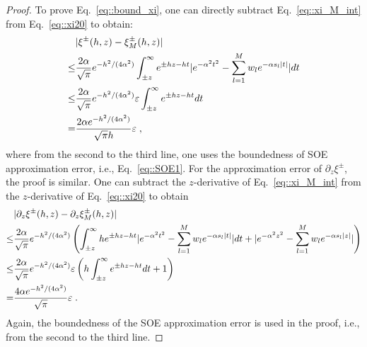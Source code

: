 \begin{proof}
	To prove Eq.~\eqref{eq::bound_xi}, one can directly subtract Eq.~\eqref{eq::xi_M_int} from  Eq.~\eqref{eq::xi20} to obtain:
	\begin{equation}
		\begin{split}
			&\lvert\xi^{\pm}(h, z) - \xi_{M}^{\pm}(h, z)\rvert\\
			\leq & \frac{2 \alpha}{\sqrt{\pi}} e^{-h^2/(4 \alpha^2)} \int_{\pm z}^\infty e^{\pm hz - h t} \lvert e^{-\alpha^2 t^2} - \sum_{l = 1}^M w_l e^{-\alpha s_l\lvert t\rvert} \rvert dt \\
			\leq & \frac{2 \alpha}{\sqrt{\pi}} e^{ - h^2/(4 \alpha^2)} \varepsilon \int_{\pm z}^\infty e^{\pm hz - h t} dt \\
			= & \frac{2 \alpha e^{-h^2/(4 \alpha^2)}}{\sqrt{\pi} h} \varepsilon\;,
		\end{split}
	\end{equation}
	where from the second to the third line, one uses the boundedness of SOE approximation error, i.e., Eq.~\eqref{eq::SOE1}.
	For the approximation error of $\partial_z\xi^{\pm}$, the proof is similar. One can subtract the $z$-derivative of Eq.~\eqref{eq::xi_M_int} from the $z$-derivative of Eq.~\eqref{eq::xi20} to obtain
	\begin{equation}
	\begin{split}
	& \lvert\partial_z \xi^{\pm}(h, z) - \partial_z \xi_{M}^{\pm}(h, z)\rvert\\
	\leq & \frac{2 \alpha}{\sqrt{\pi}} e^{-h^2/(4 \alpha^2)} \left( \int_{\pm z}^\infty h e^{\pm hz - h t} \lvert e^{-\alpha^2 t^2} - \sum_{l = 1}^M w_l e^{-\alpha s_l\lvert t\rvert} \rvert dt + \lvert e^{-\alpha^2 z^2} - \sum_{l = 1}^M w_l e^{-\alpha s_l\lvert z\rvert} \rvert \right)\\
	\leq & \frac{2 \alpha}{\sqrt{\pi}} e^{ - h^2/(4 \alpha^2)} \varepsilon \left( h \int_{\pm z}^\infty e^{\pm hz - h t} dt + 1 \right) \\
	= & \frac{4 \alpha e^{-h^2/(4 \alpha^2)}}{\sqrt{\pi}} \varepsilon\;.
	\end{split}
	\end{equation}
	Again, the boundedness of the SOE approximation error is used in the proof, i.e., from the second to the third line.
\end{proof}


